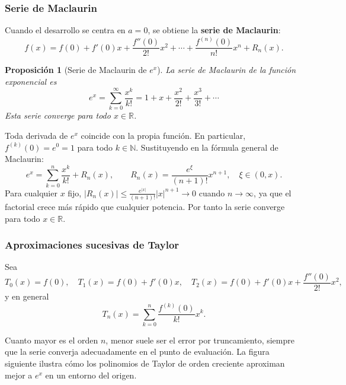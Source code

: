 \documentclass[a4paper,12pt]{article}
\newcommand{\R}{\mathbb{R}}
\newcommand{\N}{\mathbb{N}}
\theoremstyle{definition}
\theoremstyle{plain}
\newtheorem{proposicion}{Proposición}[section]
\begin{document}
\subsubsection{Serie de Maclaurin}

Cuando el desarrollo se centra en $a = 0$, se obtiene la \textbf{serie de
Maclaurin}:
\[
    f(x) = f(0) + f'(0)x + \frac{f''(0)}{2!}x^2 + \cdots
           + \frac{f^{(n)}(0)}{n!}x^n + R_n(x).
\]

\begin{proposicion}[Serie de Maclaurin de $e^x$]
La serie de Maclaurin de la función exponencial es
\[
    e^x = \sum_{k=0}^{\infty} \frac{x^k}{k!}
        = 1 + x + \frac{x^2}{2!} + \frac{x^3}{3!} + \cdots
\]
Esta serie converge para todo $x \in \R$.
\end{proposicion}

\begin{demostracion}
Toda derivada de $e^x$ coincide con la propia función. En particular,
$f^{(k)}(0) = e^0 = 1$ para todo $k \in \N$. Sustituyendo en la fórmula
general de Maclaurin:
\[
    e^x = \sum_{k=0}^{n} \frac{x^k}{k!} + R_n(x),
    \qquad
    R_n(x) = \frac{e^\xi}{(n+1)!} x^{n+1},
    \quad \xi \in (0, x).
\]
Para cualquier $x$ fijo, $|R_n(x)| \leq \frac{e^{|x|}}{(n+1)!}|x|^{n+1}
\to 0$ cuando $n \to \infty$, ya que el factorial crece más rápido que
cualquier potencia. Por tanto la serie converge para todo $x \in \R$.
\end{demostracion}

\subsubsection{Aproximaciones sucesivas de Taylor}

Sea
\[
    T_0(x) = f(0), \quad
    T_1(x) = f(0) + f'(0)x, \quad
    T_2(x) = f(0) + f'(0)x + \frac{f''(0)}{2!}x^2,
\]
y en general
\[
    T_n(x) = \sum_{k=0}^{n} \frac{f^{(k)}(0)}{k!} x^k.
\]

Cuanto mayor es el orden $n$, menor suele ser el error por truncamiento,
siempre que la serie converja adecuadamente en el punto de evaluación.
La figura siguiente ilustra cómo los polinomios de Taylor de orden creciente
aproximan mejor a $e^x$ en un entorno del origen.
\end{document}
